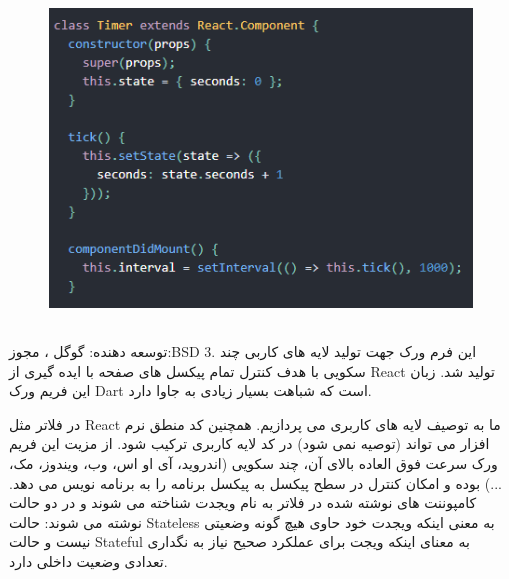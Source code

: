 \documentclass{CSICC2020}
\begin{document}
\begin{figure}[h!]
\centering\includegraphics[width=\linewidth]{Images/react-stateful}
\caption{}
\label{fig:ReactُStateful}
\end{figure}




\subsection{}
توسعه دهنده: گوگل ، مجوز:BSD 3. این فرم ورک جهت تولید لایه های کاربی چند سکویی با هدف کنترل تمام پیکسل های صفحه با ایده گیری از React تولید شد.
زبان این فریم ورک Dart است که شباهت بسیار زیادی به جاوا دارد.

در فلاتر مثل React ما به توصیف لایه های کاربری می پردازیم. همچنین کد منطق نرم افزار می تواند (توصیه نمی شود) در کد لایه کاربری ترکیب شود.
از مزیت این فریم ورک سرعت فوق العاده بالای آن، چند سکویی (اندروید، آی او اس، وب، ویندوز، مک، ...) بوده و امکان کنترل در سطح پیکسل به پیکسل برنامه را به برنامه نویس می دهد.
کامپوننت های نوشته شده در فلاتر به نام ویجدت شناخته می شوند و در دو حالت نوشته می شوند:
حالت Stateless به معنی اینکه ویجدت خود حاوی هیچ گونه وضعیتی نیست و
حالت Stateful به معنای اینکه ویجت برای عملکرد صحیح نیاز به نگداری تعدادی وضعیت داخلی دارد.
\end{document}
